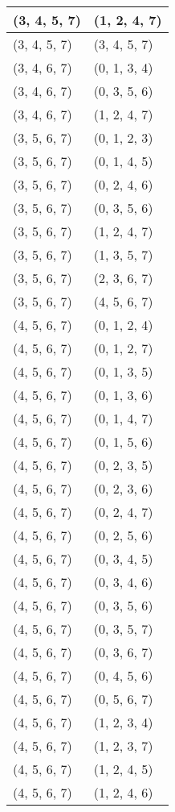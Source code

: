 \begin{footnotesize}
\begin{longtable}[c]{|l|l|}
(3, 4, 5, 7)
&(1, 2, 4, 7)
\\ \hline
(3, 4, 5, 7)
&(3, 4, 5, 7)
\\ \hline
(3, 4, 6, 7)
&(0, 1, 3, 4)
\\ \hline
(3, 4, 6, 7)
&(0, 3, 5, 6)
\\ \hline
(3, 4, 6, 7)
&(1, 2, 4, 7)
\\ \hline
(3, 5, 6, 7)
&(0, 1, 2, 3)
\\ \hline
(3, 5, 6, 7)
&(0, 1, 4, 5)
\\ \hline
(3, 5, 6, 7)
&(0, 2, 4, 6)
\\ \hline
(3, 5, 6, 7)
&(0, 3, 5, 6)
\\ \hline
(3, 5, 6, 7)
&(1, 2, 4, 7)
\\ \hline
(3, 5, 6, 7)
&(1, 3, 5, 7)
\\ \hline
(3, 5, 6, 7)
&(2, 3, 6, 7)
\\ \hline
(3, 5, 6, 7)
&(4, 5, 6, 7)
\\ \hline
(4, 5, 6, 7)
&(0, 1, 2, 4)
\\ \hline
(4, 5, 6, 7)
&(0, 1, 2, 7)
\\ \hline
(4, 5, 6, 7)
&(0, 1, 3, 5)
\\ \hline
(4, 5, 6, 7)
&(0, 1, 3, 6)
\\ \hline
(4, 5, 6, 7)
&(0, 1, 4, 7)
\\ \hline
(4, 5, 6, 7)
&(0, 1, 5, 6)
\\ \hline
(4, 5, 6, 7)
&(0, 2, 3, 5)
\\ \hline
(4, 5, 6, 7)
&(0, 2, 3, 6)
\\ \hline
(4, 5, 6, 7)
&(0, 2, 4, 7)
\\ \hline
(4, 5, 6, 7)
&(0, 2, 5, 6)
\\ \hline
(4, 5, 6, 7)
&(0, 3, 4, 5)
\\ \hline
(4, 5, 6, 7)
&(0, 3, 4, 6)
\\ \hline
(4, 5, 6, 7)
&(0, 3, 5, 6)
\\ \hline
(4, 5, 6, 7)
&(0, 3, 5, 7)
\\ \hline
(4, 5, 6, 7)
&(0, 3, 6, 7)
\\ \hline
(4, 5, 6, 7)
&(0, 4, 5, 6)
\\ \hline
(4, 5, 6, 7)
&(0, 5, 6, 7)
\\ \hline
(4, 5, 6, 7)
&(1, 2, 3, 4)
\\ \hline
(4, 5, 6, 7)
&(1, 2, 3, 7)
\\ \hline
(4, 5, 6, 7)
&(1, 2, 4, 5)
\\ \hline
(4, 5, 6, 7)
&(1, 2, 4, 6)
\\ \hline

\end{longtable}
\end{footnotesize}
